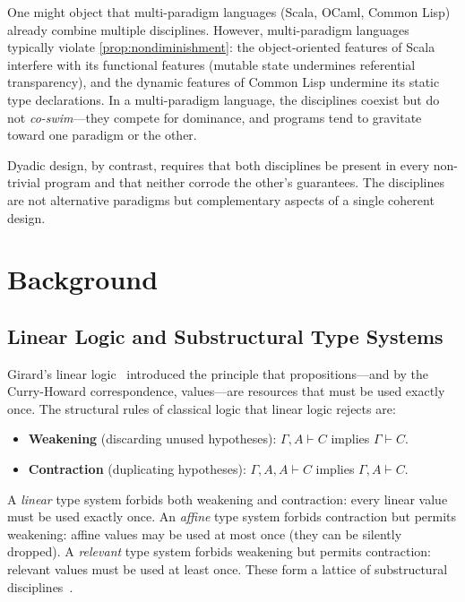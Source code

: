 \documentclass[11pt,a4paper]{article}
\newcommand{\ctx}{\Gamma}
\begin{document}
One might object that multi-paradigm languages (Scala, OCaml, Common Lisp)
already combine multiple disciplines. However, multi-paradigm languages
typically violate \ref{prop:nondiminishment}: the object-oriented features of
Scala interfere with its functional features (mutable state undermines
referential transparency), and the dynamic features of Common Lisp undermine
its static type declarations. In a multi-paradigm language, the disciplines
coexist but do not \emph{co-swim}---they compete for dominance, and programs
tend to gravitate toward one paradigm or the other.

Dyadic design, by contrast, requires that both disciplines be present in
every non-trivial program and that neither corrode the other's guarantees.
The disciplines are not alternative paradigms but complementary aspects of
a single coherent design.

\section{Background}
\label{sec:background}

\subsection{Linear Logic and Substructural Type Systems}

Girard's linear logic~\citep{girard1987linear} introduced the principle that
propositions---and by the Curry-Howard correspondence, values---are resources
that must be used exactly once. The structural rules of classical logic that
linear logic rejects are:

\begin{itemize}
  \item \textbf{Weakening} (discarding unused hypotheses): $\ctx, A \vdash C$
    implies $\ctx \vdash C$.
  \item \textbf{Contraction} (duplicating hypotheses): $\ctx, A, A \vdash C$
    implies $\ctx, A \vdash C$.
\end{itemize}

A \emph{linear} type system forbids both weakening and contraction: every
linear value must be used exactly once. An \emph{affine} type system forbids
contraction but permits weakening: affine values may be used at most once (they
can be silently dropped). A \emph{relevant} type system forbids weakening but
permits contraction: relevant values must be used at least once. These form
a lattice of substructural disciplines~\citep{walker2005substructural}.
\end{document}
